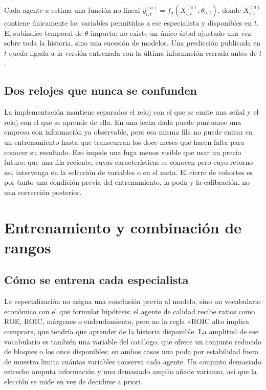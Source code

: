 Cada agente $a$ estima una función no lineal
$\hat y^{(a)}_{i,t}=f_a(X^{(a)}_{i,t};\theta_{a,t})$, donde
$X^{(a)}_{i,t}$ contiene únicamente las variables permitidas a ese especialista y disponibles en
$t$. El subíndice temporal de $\theta$ importa: no existe un único árbol ajustado una vez sobre toda
la historia, sino una sucesión de modelos. Una predicción publicada en $t$ queda ligada a la versión
entrenada con la última información cerrada antes de $t$.

\subsection{Dos relojes que nunca se confunden}

La implementación mantiene separados el reloj con el que se emite una señal y el reloj con el que se
aprende de ella. En una fecha dada puede puntuarse una empresa con información ya observable, pero
esa misma fila no puede entrar en un entrenamiento hasta que transcurran los doce meses que hacen
falta para conocer su resultado. Eso impide una fuga menos visible que usar un precio futuro: que
una fila reciente, cuyas características se conocen pero cuyo retorno no, intervenga en la selección
de variables o en el meta. El cierre de cohortes es por tanto una condición previa del
entrenamiento, la poda y la calibración, no una corrección posterior.

\section{Entrenamiento y combinación de rangos}

\subsection{Cómo se entrena cada especialista}

La especialización no asigna una conclusión previa al modelo, sino un vocabulario económico con el
que formular hipótesis: el agente de calidad recibe ratios como ROE, ROIC, márgenes o endeudamiento,
pero no la regla «ROIC alto implica comprar», que tendría que aprender de la historia disponible. La
amplitud de ese vocabulario es también una variable del catálogo, que ofrece un conjunto reducido de
bloques o los once disponibles; en ambos casos una poda por estabilidad fuera de muestra limita
cuántas variables conserva cada agente. Un conjunto demasiado estrecho amputa información y uno
demasiado amplio añade varianza, así que la elección se mide en vez de decidirse a priori.


